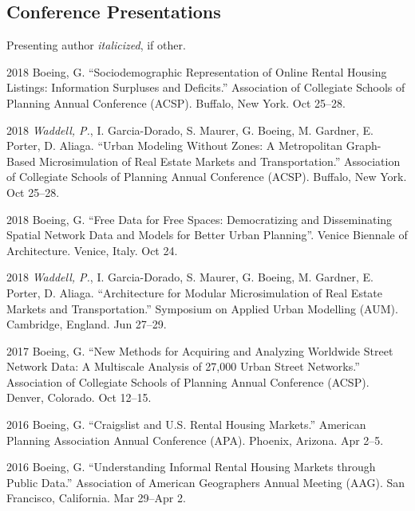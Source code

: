 \documentclass[12pt,letterpaper]{report}
\begin{document}
\subsection*{Conference Presentations}

Presenting author \textit{italicized}, if other.\bigskip

\begin{tablist}

\item[2018] \tab Boeing, G. \enquote{Sociodemographic Representation of Online Rental Housing Listings: Information Surpluses and Deficits.} Association of Collegiate Schools of Planning Annual Conference (ACSP). Buffalo, New York. Oct 25--28.

\item[2018] \tab \textit{Waddell, P.}, I. Garcia-Dorado, S. Maurer, G. Boeing, M. Gardner, E. Porter, D. Aliaga. \enquote{Urban Modeling Without Zones: A Metropolitan Graph-Based Microsimulation of Real Estate Markets and Transportation.} Association of Collegiate Schools of Planning Annual Conference (ACSP). Buffalo, New York. Oct 25--28.

\item[2018] \tab Boeing, G. \enquote{Free Data for Free Spaces: Democratizing and Disseminating Spatial Network Data and Models for Better Urban Planning}. Venice Biennale of Architecture. Venice, Italy. Oct 24.

\item[2018] \tab \textit{Waddell, P.}, I. Garcia-Dorado, S. Maurer, G. Boeing, M. Gardner, E. Porter, D. Aliaga. \enquote{Architecture for Modular Microsimulation of Real Estate Markets and Transportation.} Symposium on Applied Urban Modelling (AUM). Cambridge, England. Jun 27--29.

\item[2017] \tab Boeing, G. \enquote{New Methods for Acquiring and Analyzing Worldwide Street Network Data: A Multiscale Analysis of 27,000 Urban Street Networks.} Association of Collegiate Schools of Planning Annual Conference (ACSP). Denver, Colorado. Oct 12--15.

\item[2016] \tab Boeing, G. \enquote{Craigslist and U.S. Rental Housing Markets.} American Planning Association Annual Conference (APA). Phoenix, Arizona. Apr 2--5.

\item[2016] \tab Boeing, G. \enquote{Understanding Informal Rental Housing Markets through Public Data.} Association of American Geographers Annual Meeting (AAG). San Francisco, California. Mar 29--Apr 2.


\end{tablist}
\end{document}
